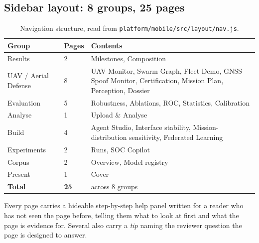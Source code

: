 \documentclass[11pt,a4paper]{article}
\newcommand{\code}[1]{\texttt{#1}}
\begin{document}
\subsection{Sidebar layout: 8 groups, 25 pages}
\begin{table}[H]
\centering\small
\begin{tabularx}{\linewidth}{@{}p{3.4cm}p{1.0cm}X@{}}
\toprule
\textbf{Group} & \textbf{Pages} & \textbf{Contents} \\
\midrule
Results & 2 & Milestones, Composition \\
UAV / Aerial Defense & 8 & UAV Monitor, Swarm Graph, Fleet Demo, GNSS Spoof Monitor, Certification, Mission Plan, Perception, Dossier \\
Evaluation & 5 & Robustness, Ablations, ROC, Statistics, Calibration \\
Analyse & 1 & Upload \& Analyse \\
Build & 4 & Agent Studio, Interface stability, Mission-distribution sensitivity, Federated Learning \\
Experiments & 2 & Runs, SOC Copilot \\
Corpus & 2 & Overview, Model registry \\
Present & 1 & Cover \\
\midrule
\textbf{Total} & \textbf{25} & across 8 groups \\
\bottomrule
\end{tabularx}
\caption{Navigation structure, read from \code{platform/mobile/src/layout/nav.js}.}
\end{table}

Every page carries a hideable step-by-step help panel written for a reader who
has not seen the page before, telling them what to look at first and what the
page is evidence for. Several also carry a \emph{tip} naming the reviewer
question the page is designed to answer.
\end{document}
